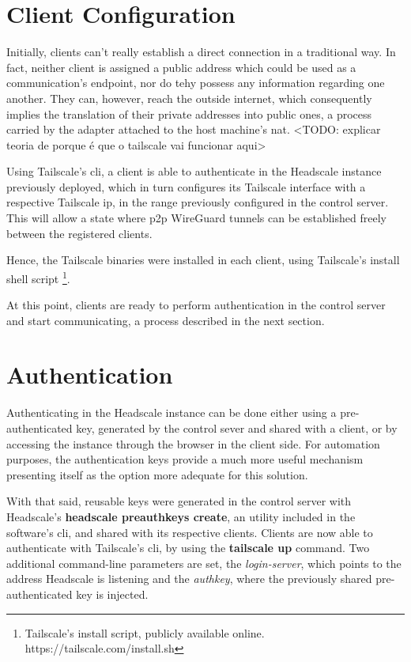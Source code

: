 \documentclass[11pt,twoside,a4paper]{report}
\begin{document}
\section{Client Configuration}

Initially, clients can't really establish a direct connection in a traditional way. In fact, neither client is assigned a public address which could be used as a communication's endpoint, nor do tehy possess any information regarding one another. They can, however, reach the outside internet, which consequently implies the translation of their private addresses into public ones, a process carried by the adapter attached to the host machine's \ac{nat}. <TODO: explicar teoria de porque é que o tailscale vai funcionar aqui>

Using Tailscale's \ac{cli}, a client is able to authenticate in the Headscale instance previously deployed, which in turn configures its Tailscale interface with a respective Tailscale \ac{ip}, in the range previously configured in the control server. This will allow a state where \ac{p2p} WireGuard tunnels can be established freely between the registered clients.

Hence, the Tailscale binaries were installed in each client, using Tailscale's install shell script \footnote{Tailscale's install script, publicly available online. https://tailscale.com/install.sh}.

At this point, clients are ready to perform authentication in the control server and start communicating, a process described in the next section.

\section{Authentication}

Authenticating in the Headscale instance can be done either using a pre-authenticated key, generated by the control sever and shared with a client, or by accessing the instance through the browser in the client side. For automation purposes, the authentication keys provide a much more useful mechanism presenting itself as the option more adequate for this solution.

With that said, reusable keys were generated in the control server with Headscale's \textbf{headscale preauthkeys create}, an utility included in the software's \ac{cli}, and shared with its respective clients. Clients are now able to authenticate with Tailscale's \ac{cli}, by using the \textbf{tailscale up} command. Two additional command-line parameters are set, the \emph{login-server}, which points to the address Headscale is listening and the \emph{authkey}, where the previously shared pre-authenticated key is injected.
\end{document}
